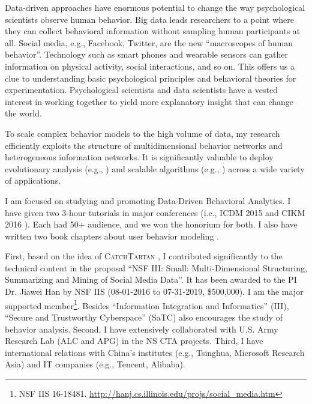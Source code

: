 \documentclass[10.5pt]{article}
\begin{document}
Data-driven approaches have enormous potential to change the way psychological scientists observe human behavior. Big data leads researchers to a point where they can collect behavioral information without sampling human participants at all. Social media, e.g., Facebook, Twitter, are the new ``macroscopes of human behavior''. Technology such as smart phones and wearable sensors can gather information on physical activity, social interactions, and so on. This offers us a clue to understanding basic psychological principles and behavioral theories for experimentation. Psychological scientists and data scientists have a vested interest in working together to yield more explanatory insight that can change the world.

To scale complex behavior models to the high volume of data, my research efficiently exploits the structure of multidimensional behavior networks and heterogeneous information networks. It is significantly valuable to deploy evolutionary analysis (e.g., \cite{jiang2014scalable,jiang2014fema}) and scalable algorithms (e.g., \cite{jiang2014catchsync,jiang2016catchtartan}) across a wide variety of applications.

\vskip 0.02in
 I am focused on studying and promoting Data-Driven Behavioral Analytics. I have given two 3-hour tutorials in major conferences (i.e., ICDM 2015 \cite{jiang2015behavior} and CIKM 2016 \cite{jiang2016data}). Each had 50+ audience, and we won the honorium for both. I also have written two book chapters about user behavior modeling \cite{jiang2016mining,jiang2016behavior}.

\vskip 0.02in
 First, based on the idea of \textsc{CatchTartan} \cite{jiang2016catchtartan}, I contributed significantly to the technical content in the proposal ``NSF III: Small: Multi-Dimensional Structuring, Summarizing and Mining of Social Media Data''. It has been awarded to the PI Dr. Jiawei Han by NSF IIS (08-01-2016 to 07-31-2019, \$500,000). I am the major supported member\footnote{NSF IIS 16-18481. \url{http://hanj.cs.illinois.edu/projs/social\_media.htm}}. Besides ``Information Integration and Informatics'' (III), ``Secure and Trustworthy Cyberspace'' (SaTC) also encourages the study of behavior analysis. Second, I have extensively collaborated with U.S. Army Research Lab (ALC and APG) in the NS CTA projects. Third, I have international relations with China's institutes (e.g., Tsinghua, Microsoft Research Asia) and IT companies (e.g., Tencent, Alibaba).

\vspace{-0.20in}
\small{
\begin{footnotesize}


\end{footnotesize}
}
\end{document}
